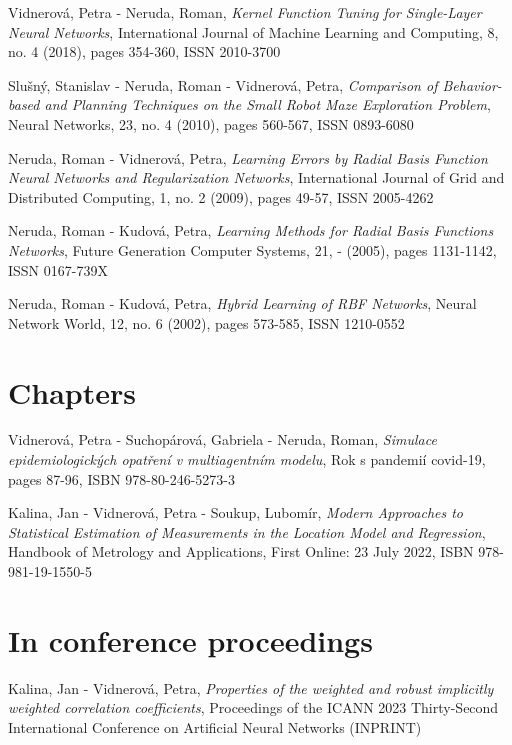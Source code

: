 \vspace{0.4em}
\noindent
Vidnerová, Petra - Neruda, Roman, {\em Kernel Function Tuning for Single-Layer Neural Networks}, International Journal of Machine Learning and Computing,  8, no. 4 (2018), pages 354-360, ISSN 2010-3700

\vspace{0.4em}
\noindent
Slušný, Stanislav - Neruda, Roman - Vidnerová, Petra, {\em Comparison of Behavior-based and Planning Techniques on the Small Robot Maze Exploration Problem}, Neural Networks,  23, no. 4 (2010), pages 560-567, ISSN 0893-6080

\vspace{0.4em}
\noindent
Neruda, Roman - Vidnerová, Petra, {\em Learning Errors by Radial Basis Function Neural Networks and  Regularization Networks}, International Journal of  Grid and Distributed Computing,  1, no. 2 (2009), pages 49-57, ISSN 2005-4262

\vspace{0.4em}
\noindent
Neruda, Roman - Kudová, Petra, {\em Learning Methods for Radial Basis Functions Networks}, Future Generation Computer Systems,  21, - (2005), pages 1131-1142, ISSN 0167-739X

\vspace{0.4em}
\noindent
Neruda, Roman - Kudová, Petra, {\em Hybrid Learning of RBF Networks}, Neural Network World,  12, no. 6 (2002), pages 573-585, ISSN 1210-0552

\section{Chapters}
Vidnerová, Petra - Suchopárová, Gabriela - Neruda, Roman, {\em Simulace epidemiologických opatření v multiagentním modelu}, Rok s pandemií covid-19, pages 87-96, ISBN 978-80-246-5273-3

\vspace{0.4em}
\noindent
Kalina, Jan - Vidnerová, Petra - Soukup, Lubomír, {\em Modern Approaches to Statistical Estimation of Measurements in the Location Model and Regression}, Handbook of Metrology and Applications, First Online: 23 July 2022, ISBN 978-981-19-1550-5


\section{In conference proceedings}
Kalina, Jan - Vidnerová, Petra, {\em Properties of the weighted and robust implicitly weighted correlation coefficients}, Proceedings of the ICANN 2023 Thirty-Second International Conference on Artificial Neural Networks (INPRINT)

